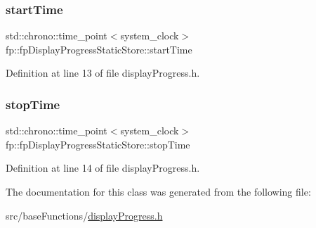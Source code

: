 \subsubsection{\texorpdfstring{start\+Time}{startTime}}
{\footnotesize\ttfamily std\+::chrono\+::time\+\_\+point$<$system\+\_\+clock$>$ fp\+::fp\+Display\+Progress\+Static\+Store\+::start\+Time\hspace{0.3cm}{\ttfamily [private]}}



Definition at line 13 of file display\+Progress.\+h.

\mbox{\label{classfp_1_1fpDisplayProgressStaticStore_a7af621498c605e7955b9f1bb2abdb5a4}} 
\subsubsection{\texorpdfstring{stop\+Time}{stopTime}}
{\footnotesize\ttfamily std\+::chrono\+::time\+\_\+point$<$system\+\_\+clock$>$ fp\+::fp\+Display\+Progress\+Static\+Store\+::stop\+Time\hspace{0.3cm}{\ttfamily [private]}}



Definition at line 14 of file display\+Progress.\+h.



The documentation for this class was generated from the following file\+:\begin{DoxyCompactItemize}
\item 
src/base\+Functions/\hyperlink{displayProgress_8h}{display\+Progress.\+h}\end{DoxyCompactItemize}

